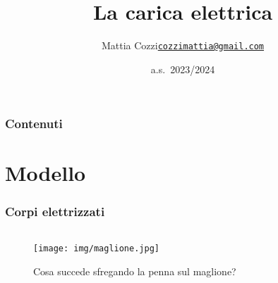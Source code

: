 \documentclass[]{beamer}
\title{La carica elettrica}
\author{\texorpdfstring{Mattia Cozzi\newline\href{mailto:cozzimattia@gmail.com}{\texttt{cozzimattia@gmail.com}}}{Mattia Cozzi}}
\date{a.s.~2023/2024}
\theoremstyle{plain}
\begin{document}
\begin{frame}
  \titlepage
\end{frame}





\begin{frame}
\frametitle{Contenuti}
\tableofcontents
\end{frame}


\section{Modello}

\begin{frame}
  \frametitle{Corpi elettrizzati}
  \begin{columns}
    \begin{column}{0.3\textwidth}
      \begin{figure}
        \texttt{[image: img/maglione.jpg]}
        
        Cosa succede sfregando la penna sul maglione?
      \end{figure}
    \end{column}
    \begin{column}{0.3\textwidth}
    \end{column}
    \begin{column}{0.3\textwidth}
    \end{column}
  \end{columns}
\end{frame}
\end{document}
